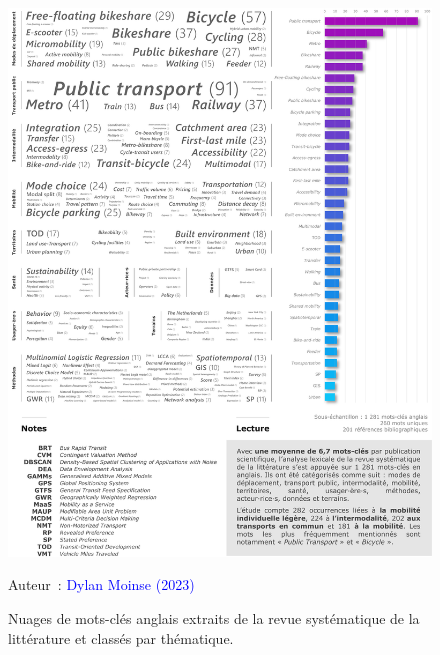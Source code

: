 \begin{refsegment}
    \begin{figure}[h!]\vspace*{4pt}
        \caption{Nuages de mots-clés anglais extraits de la revue systématique de la littérature et classés par thématique.}
        \label{fig-chap2:nuage-mots-cles-rsl}
        \centerline{\includegraphics[width=1\columnwidth]{src/Figures/Chap-2/FR_RSL_Nuage_mots_cles_thematiques.pdf}}
        \vspace{5pt}
        \begin{flushright}\scriptsize{
        Auteur~: \textcolor{blue}{Dylan Moinse (2023)}
        }\end{flushright}
    \end{figure}


\end{refsegment}
